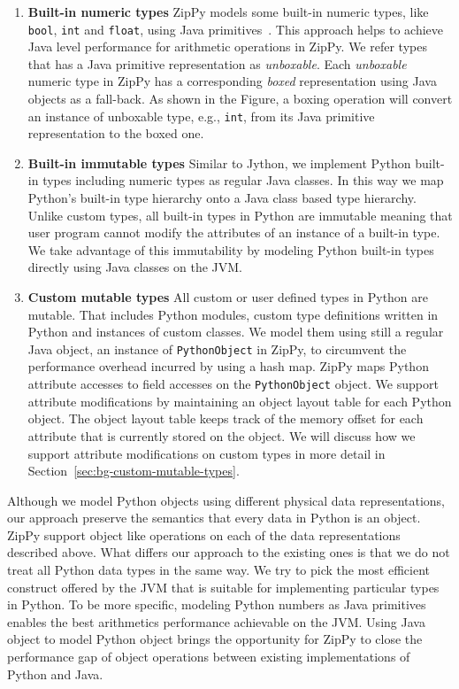 \begin{enumerate}

\item \textbf{Built-in numeric types}
ZipPy models some built-in numeric types, like \texttt{bool}, \texttt{int} and \texttt{float}, using Java primitives~\cite{Zhang+2014}.
This approach helps to achieve Java level performance for arithmetic operations in ZipPy.
We refer types that has a Java primitive representation as \emph{unboxable}.
Each \emph{unboxable} numeric type in ZipPy has a corresponding \emph{boxed} representation using Java objects as a fall-back.
As shown in the Figure, a boxing operation will convert an instance of unboxable type, e.g., \texttt{int}, from its Java primitive representation to the boxed one.

\item \textbf{Built-in immutable types}
Similar to Jython, we implement Python built-in types including numeric types as regular Java classes.
In this way we map Python's built-in type hierarchy onto a Java class based type hierarchy.
Unlike custom types, all built-in types in Python are immutable meaning that user program cannot modify the attributes of an instance of a built-in type.
We take advantage of this immutability by modeling Python built-in types directly using Java classes on the JVM.

\item \textbf{Custom mutable types}
All custom or user defined types in Python are mutable.
That includes Python modules, custom type definitions written in Python and instances of custom classes.
We model them using still a regular Java object, an instance of \texttt{PythonObject} in ZipPy, to circumvent the performance overhead incurred by using a hash map.
ZipPy maps Python attribute accesses to field accesses on the \texttt{PythonObject} object.
We support attribute modifications by maintaining an object layout table for each Python object.
The object layout table keeps track of the memory offset for each attribute that is currently stored on the object.
We will discuss how we support attribute modifications on custom types in more detail in Section~\ref{sec:bg-custom-mutable-types}.

\end{enumerate}

Although we model Python objects using different physical data representations, our approach preserve the semantics that every data in Python is an object.
ZipPy support object like operations on each of the data representations described above.
What differs our approach to the existing ones is that we do not treat all Python data types in the same way.
We try to pick the most efficient construct offered by the JVM that is suitable for implementing particular types in Python.
To be more specific, modeling Python numbers as Java primitives enables the best arithmetics performance achievable on the JVM.
Using Java object to model Python object brings the opportunity for ZipPy to close the performance gap of object operations between existing implementations of Python and Java.

